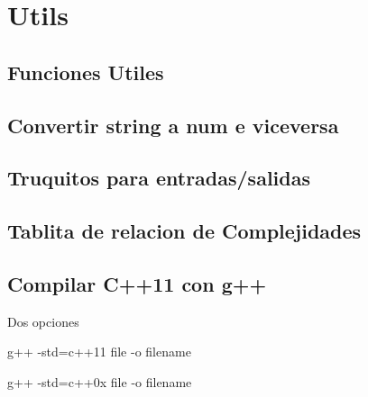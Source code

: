\section{Utils}
\subsection{Funciones Utiles}

\subsection{Convertir string a num e viceversa}

\subsection{Truquitos para entradas/salidas}

\subsection{Tablita de relacion de Complejidades}

\subsection{Compilar C++11 con g++}
Dos opciones
\begin{code}
g++ -std=c++11 {file} -o {filename}

g++ -std=c++0x {file} -o {filename}
\end{code}
